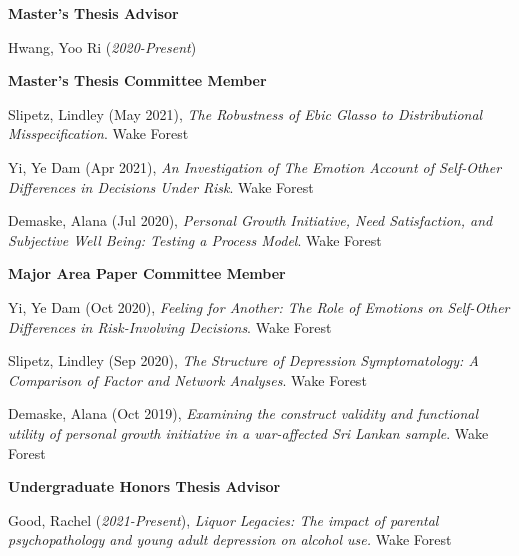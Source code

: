 {\large\textbf{Master's Thesis Advisor}}
\begin{etaremune}%
\item Hwang, Yoo Ri (\textit{2020-Present})
\end{etaremune}%

{\large\textbf{Master's Thesis Committee Member}}
\begin{etaremune}%
\item  Slipetz, Lindley (May 2021), \textit{The Robustness of Ebic Glasso to Distributional Misspecification}. Wake Forest
\item Yi, Ye Dam (Apr 2021), \textit{An Investigation of The Emotion Account of Self-Other Differences in Decisions Under Risk}. Wake Forest
\item Demaske, Alana (Jul 2020), \textit{Personal Growth Initiative, Need Satisfaction, and Subjective Well Being: Testing a Process Model}. Wake Forest%
\end{etaremune}%
%
{\large\textbf{Major Area Paper Committee Member}}
\begin{etaremune}%
\item Yi, Ye Dam (Oct 2020), \textit{Feeling for Another: The Role of Emotions on Self-Other Differences in Risk-Involving Decisions}. Wake Forest%
\item Slipetz, Lindley (Sep 2020), \textit{The Structure of Depression Symptomatology: A Comparison of Factor and Network Analyses}. Wake Forest%
\item Demaske, Alana (Oct 2019), \textit{Examining the construct validity and functional utility of personal growth initiative in a war-affected Sri Lankan sample}. Wake Forest%
\end{etaremune}%
%
{\large\textbf{Undergraduate Honors Thesis Advisor}}
\begin{etaremune}%
\item Good, Rachel (\textit{2021-Present}), \textit{Liquor Legacies: The impact of parental psychopathology and young adult depression on alcohol use.} Wake Forest%
\end{etaremune}%

